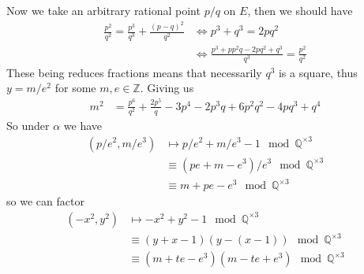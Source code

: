 \begin{example}
  Now we take an arbitrary rational point $p/q$ on $E$,
  then we should have
  \begin{align*}
    \frac{p^2}{q^2} = \frac{p^3}{q^3} + \frac{(p - q)^2}{q^2} &\iff p^3 + q^3 = 2pq^2 \\
                                                              &\iff \frac{p^3 + pp^2 q - 2pq^2 + q^3}{q^3} = \frac{p^2}{q^2}
  \end{align*}
  These being reduces fractions means that necessarily $q^3$ is a square,
  thus $y = m/e^2$ for some $m, e \in \mathbb{Z}$.
  Giving us
  \begin{align*}
    m^2 &= \frac{p^6}{q^2} + \frac{2p^5}{q} - 3 p^4 - 2p^3q + 6p^2 q^2 - 4 pq^3 + q^{4}
  \end{align*}
  So under $\alpha$ we have
  \begin{align*}
    (p/e^2, m/e^3) &\mapsto p/e^2 + m/e^3 - 1 \mod \mathbb{Q}^{\times 3} \\
                   &\equiv (pe + m - e^3)/e^3 \mod \mathbb{Q}^{\times 3} \\
                   &\equiv m + pe - e^3 \mod \mathbb{Q}^{\times 3}
  \end{align*}
  so we can factor
  \begin{align*}
    (-x^2 , y^2) &\mapsto -x^2 + y^2 - 1 \mod \mathbb{Q}^{\times 3} \\
                 &\equiv (y + x - 1)(y - (x - 1)) \mod \mathbb{Q}^{\times 3} \\
                 &\equiv (m + te - e^3)(m - te + e^3) \mod \mathbb{Q}^{\times 3}
  \end{align*}


\end{example}
